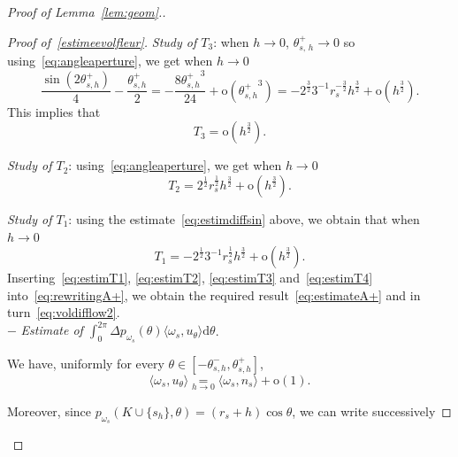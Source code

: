 \documentclass[AHL,Unicode,longabstracts,published]{cedram}
\newcommand{\dd}{\mathrm{d}}
\newcommand{\od}{\mathrm{o}}
\newcommand{\pass}{\vspace{0.3cm}\noindent}
\newcommand{\noi}{\noindent}
\newenvironment*{prooff}{\begin{proof}}{\let\qed\relax\end{proof}}
\begin{document}
\begin{proof}[{Proof of Lemma~\ref{lem:geom}.}]
\begin{prooff}[{Proof of~\eqref{estimeevolfleur}}]
\noindent\emph{Study of $T_3$}: when $h\to 0$, $\theta_{s,\,h}^+\to 0$ so using~\eqref{eq:angleaperture}, we get when $h\to 0$
\begin{equation}\label{eq:estimdiffsin}
\frac{\sin (2\theta_{s,h}^+)}{4}-\frac{\theta_{s,h}^+}{2}= -\frac{8 {\theta_{s,h}^+}^3}{24}+\od\left({\theta_{s,h}^+}^3\right) = -2^{\frac32}3^{-1}r_s^{-\frac32}h^{\frac32}+\od\left(h^{\frac32}\right).
\end{equation}
This implies that
\begin{equation}\label{eq:estimT3}
T_3=\od\left(h^{\frac32}\right).
\end{equation}


\noindent\emph{Study of $T_2$}: using~\eqref{eq:angleaperture}, we get when $h\to 0$
\begin{equation}\label{eq:estimT2}
T_2=2^{\frac12}r_s^{\frac12}h^{\frac32}+\od\left(h^{\frac32}\right).
\end{equation}


\noindent\emph{Study of $T_1$}: using the estimate~\eqref{eq:estimdiffsin} above, we obtain that when $h\to 0$
\begin{equation}\label{eq:estimT1}
T_1=-2^{\frac12}3^{-1}r_s^{\frac12}h^{\frac32}+\od\left(h^{\frac32}\right).
\end{equation}
Inserting~\eqref{eq:estimT1}, \eqref{eq:estimT2}, \eqref{eq:estimT3} and~\eqref{eq:estimT4} into~\eqref{eq:rewritingA+}, we obtain the required result~\eqref{eq:estimateA+} and in turn~\eqref{eq:voldifflow2}.\\

$-$ \emph{Estimate of $\int_0^{2\pi} \Delta p_{\omega_s}(\theta)\langle \omega_s, u_{\theta}\rangle\dd\theta$}.

We have, uniformly for every $\theta\in[-\theta_{s,h}^-,\theta_{s,h}^+]$,
\[
\langle \omega_s, u_{\theta}\rangle \underset{h\to 0}{=} \langle \omega_s, n_s\rangle + \od(1).
\]

Moreover, since $p_{\omega_s}(K\cup\{s_h\},\theta)= (r_s+h)\cos\theta$, we can write successively


\end{prooff}
\end{proof}
\end{document}
